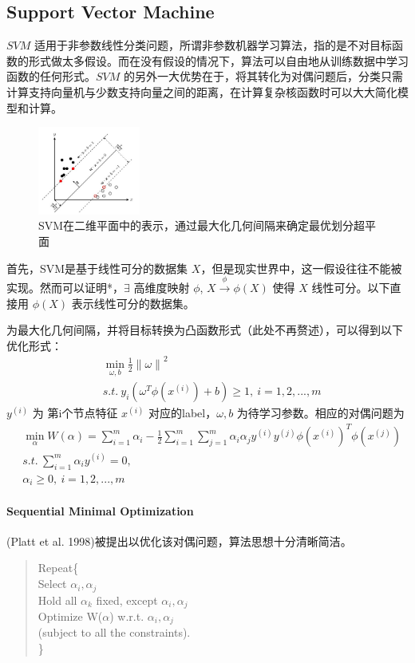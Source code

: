 \documentclass[UTF8, fleqn,10pt]{SelfArx} %
\begin{document}
	\subsection{Support Vector Machine}
	$SVM$ 适用于非参数线性分类问题，所谓非参数机器学习算法，指的是不对目标函数的形式做太多假设。而在没有假设的情况下，算法可以自由地从训练数据中学习函数的任何形式。$SVM$ 的另外一大优势在于，将其转化为对偶问题后，分类只需计算支持向量机与少数支持向量之间的距离，在计算复杂核函数时可以大大简化模型和计算。
	\begin{figure}[H]
		\centering
		\includegraphics[width=0.3\textwidth]{figure/svm}
		\caption{SVM在二维平面中的表示，通过最大化几何间隔来确定最优划分超平面}
	\end{figure}
	首先，SVM是基于线性可分的数据集 $X$，但是现实世界中，这一假设往往不能被实现。然而可以证明*，$\exists$ 高维度映射 $\phi$, $X \xrightarrow{\phi} \phi(X)$ 使得 $X$ 线性可分。以下直接用 $\phi(X)$ 表示线性可分的数据集。\par
	为最大化几何间隔，并将目标转换为凸函数形式（此处不再赘述），可以得到以下优化形式：
	\begin{equation}
	\begin{aligned}
	&\mathop{min}\limits_{\omega, b} \frac{1}{2} \left\|\omega\right\|^2\\
	&s.t. \   y_{i}(\omega^{T}\phi(x^{(i)})+b) \geq 1,\ i = 1,2,...,m
	\end{aligned}
	\end{equation}
	$y^{(i)}$ 为 第i个节点特征 $x^{(i)}$ 对应的label，$\omega, b$ 为待学习参数。相应的对偶问题为
	\begin{equation}
	\begin{aligned}
	&\mathop{min}\limits_{\alpha} W(\alpha) =\sum_{i=1}^{m} \alpha_{i}-\frac{1}{2}\sum_{i=1}^{m}\sum_{j=1}^{m}\alpha_{i}\alpha_{j}y^{(i)}y^{(j)}\phi(x^{(i)})^{T}\phi(x^{(j)})\\
	&s.t. \   \sum_{i=1}^{m}\alpha_{i}y^{(i)} = 0,\\
	&\alpha_{i} \geq 0,\ i=1, 2, ..., m
	\end{aligned}
	\end{equation}
	\paragraph{Sequential Minimal Optimization}(Platt et al. 1998)被提出以优化该对偶问题，算法思想十分清晰简洁。
	\begin{quote}
		Repeat\{\\
		Select $\alpha_{i},\alpha_{j}$\\
		Hold all $\alpha_{k}$ fixed, except $\alpha_{i},\alpha_{j}$\\
		Optimize W($\alpha$) w.r.t. $\alpha_{i},\alpha_{j}$\\(subject to all the constraints).\\
		\}
	\end{quote}
\end{document}
